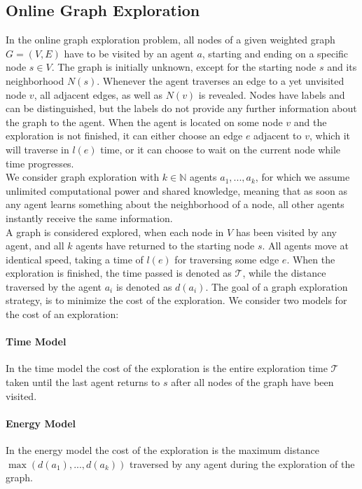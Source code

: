 \subsection{Online Graph Exploration}\label{graph_exploration}
In the online graph exploration problem, all nodes of a given weighted graph $G=(V,E)$ have to be visited by an agent $a$, starting and ending on a specific node $s \in V$.
The graph is initially unknown, except for the starting node $s$ and its neighborhood $N(s)$. Whenever the agent traverses an edge to a yet unvisited node $v$, all
adjacent edges, as well as $N(v)$ is revealed. Nodes have labels and can be distinguished, but the labels do not provide any further information about the graph to the agent.
When the agent is located on some node $v$ and the exploration is not finished, it can either choose an edge $e$ adjacent to $v$, which it will traverse in $l(e)$ time,
or it can choose to wait on the current node while time progresses.\\
We consider graph exploration with $k \in \mathbb{N}$ agents $a_1,...,a_k$, for which we assume unlimited computational power and shared knowledge, meaning that as soon as any agent learns
something about the neighborhood of a node, all other agents instantly receive the same information.\\
A graph is considered explored, when each node in $V$ has been visited by any agent, and
all $k$ agents have returned to the starting node $s$. All agents move at identical speed, taking a time of $l(e)$ for traversing some edge $e$. When the exploration is finished, the time passed is denoted as $\mathcal{T}$, while the distance traversed by the
agent $a_i$ is denoted as $d(a_i)$. The goal of a graph exploration strategy, is to minimize the cost of the exploration. We consider two models for the cost of an exploration:

\paragraph*{Time Model} 
In the time model the cost of the exploration is the entire exploration time $\mathcal{T}$ taken until the last agent returns to $s$ after all nodes of the graph have been visited.

\paragraph*{Energy Model}
In the energy model the cost of the exploration is the maximum distance \linebreak$\max(d(a_1), ... ,d(a_k))$ traversed by any agent during the exploration of the graph.

